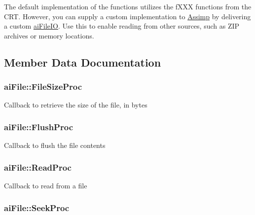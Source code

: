 The default implementation of the functions utilizes the f\-X\-X\-X functions from the C\-R\-T. However, you can supply a custom implementation to \hyperlink{namespace_assimp}{Assimp} by delivering a custom \hyperlink{structai_file_i_o}{ai\-File\-I\-O}. Use this to enable reading from other sources, such as Z\-I\-P archives or memory locations. 

\subsection{Member Data Documentation}
\hypertarget{structai_file_aff2fff8c0458e7ec71f7de217c3a3033}{
\subsubsection[{File\-Size\-Proc}]{ ai\-File\-::\-File\-Size\-Proc}}\label{structai_file_aff2fff8c0458e7ec71f7de217c3a3033}
Callback to retrieve the size of the file, in bytes \hypertarget{structai_file_a1102d28d1c0be68ffed20476669bdb0d}{
\subsubsection[{Flush\-Proc}]{ ai\-File\-::\-Flush\-Proc}}\label{structai_file_a1102d28d1c0be68ffed20476669bdb0d}
Callback to flush the file contents \hypertarget{structai_file_a52287e81ca67b9d43cc1ce6142f781fa}{
\subsubsection[{Read\-Proc}]{ ai\-File\-::\-Read\-Proc}}\label{structai_file_a52287e81ca67b9d43cc1ce6142f781fa}
Callback to read from a file \hypertarget{structai_file_a7a07b499be4ad433669246479a4d4ad2}{
\subsubsection[{Seek\-Proc}]{ ai\-File\-::\-Seek\-Proc}}\label{structai_file_a7a07b499be4ad433669246479a4d4ad2}
